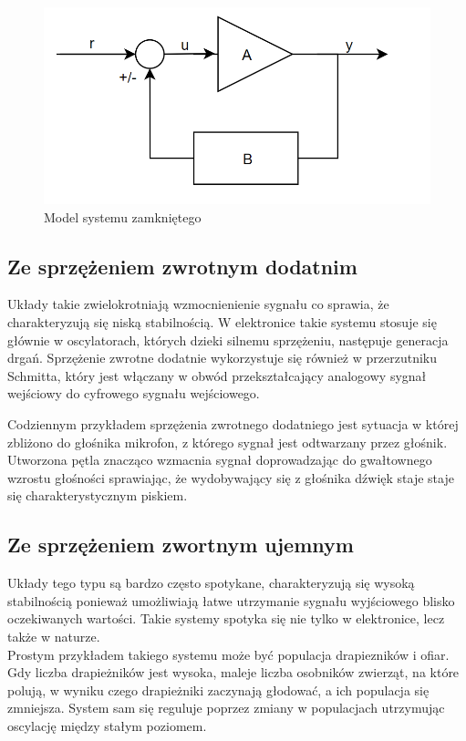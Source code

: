 \documentclass{article}
\begin{document}
\begin{figure}[h!]
\centering
\includegraphics[scale=0.4]{feedback.png}
\caption{Model systemu zamkniętego}
\label{fig:model}
\end{figure}

\subsection{Ze sprzężeniem zwrotnym dodatnim}


\quad Układy takie zwielokrotniają wzmocnienienie sygnału co sprawia, że charakteryzują się niską stabilnością. 
W elektronice takie systemu stosuje się głównie w oscylatorach, których dzieki silnemu sprzężeniu, następuje generacja drgań.
Sprzężenie zwrotne dodatnie wykorzystuje się również w przerzutniku Schmitta, który jest włączany w obwód przekształcający analogowy sygnał wejściowy do cyfrowego sygnału wejściowego.

Codziennym przykładem sprzężenia zwrotnego dodatniego jest sytuacja w której zbliżono do głośnika mikrofon, z którego sygnał jest odtwarzany przez głośnik. Utworzona pętla znacząco wzmacnia sygnał doprowadzając do gwałtownego wzrostu głośności sprawiając, że wydobywający się z głośnika dźwięk staje staje się charakterystycznym piskiem.

\subsection{Ze sprzężeniem zwortnym ujemnym}

\quad Układy tego typu są bardzo często spotykane, charakteryzują się wysoką stabilnością ponieważ umożliwiają łatwe utrzymanie sygnału wyjściowego blisko oczekiwanych wartości. Takie systemy spotyka się nie tylko w elektronice, lecz także w naturze.\\ Prostym przykładem takiego systemu może być populacja drapiezników i ofiar. Gdy liczba drapieżników jest wysoka, maleje liczba osobników zwierząt, na które polują, w wyniku czego drapieżniki zaczynają głodować, a ich populacja się zmniejsza. System sam się reguluje poprzez zmiany w populacjach utrzymując oscylację między stałym poziomem. 
\end{document}
